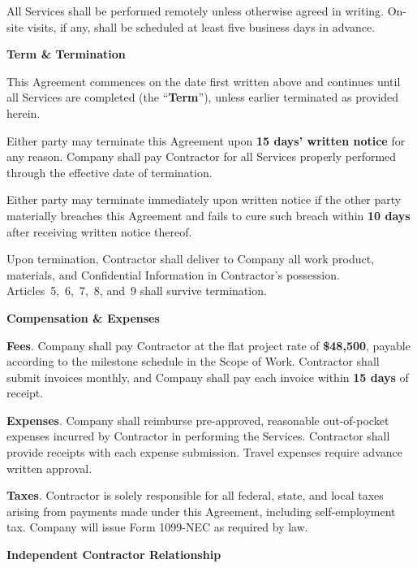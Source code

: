 \documentclass[10pt]{article}
\newcounter{artcnt}
\newcommand{\article}[1]{%
  \stepcounter{artcnt}%
  \vspace{11pt}%
  \noindent\makebox[22pt][l]{{\color{accent}\bfseries\Large\theartcnt.}}%
  {\color{accent}\bfseries\large#1}%
  \vspace{3pt}\par%
}
\newcommand{\cl}[1]{%
  \par\vspace{2pt}\noindent{\color{accent}\bfseries(#1)}\enspace%
}
\begin{document}
\cl{b} All Services shall be performed remotely unless otherwise agreed in writing. On-site visits, if any, shall be scheduled at least five business days in advance.

\article{Term \& Termination}

This Agreement commences on the date first written above and continues until all Services are completed (the ``\textbf{Term}''), unless earlier terminated as provided herein.

\cl{a} Either party may terminate this Agreement upon \textbf{15 days' written notice} for any reason. Company shall pay Contractor for all Services properly performed through the effective date of termination.

\cl{b} Either party may terminate immediately upon written notice if the other party materially breaches this Agreement and fails to cure such breach within \textbf{10 days} after receiving written notice thereof.

\cl{c} Upon termination, Contractor shall deliver to Company all work product, materials, and Confidential Information in Contractor's possession. Articles~5,~6,~7,~8, and~9 shall survive termination.

\article{Compensation \& Expenses}

\cl{a} \textbf{Fees}. Company shall pay Contractor at the flat project rate of \textbf{\$48,500}, payable according to the milestone schedule in the Scope of Work. Contractor shall submit invoices monthly, and Company shall pay each invoice within \textbf{15 days} of receipt.

\cl{b} \textbf{Expenses}. Company shall reimburse pre-approved, reasonable out-of-pocket expenses incurred by Contractor in performing the Services. Contractor shall provide receipts with each expense submission. Travel expenses require advance written approval.

\cl{c} \textbf{Taxes}. Contractor is solely responsible for all federal, state, and local taxes arising from payments made under this Agreement, including self-employment tax. Company will issue Form 1099-NEC as required by law.

\article{Independent Contractor Relationship}
\end{document}
